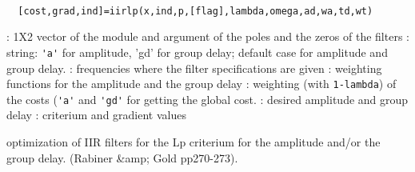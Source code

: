 
\begin{mandesc}
   \\ %
\end{mandesc}
\begin{calling_sequence}
\begin{verbatim}
  [cost,grad,ind]=iirlp(x,ind,p,[flag],lambda,omega,ad,wa,td,wt)  
\end{verbatim}
\end{calling_sequence}
\begin{parameters}
  \begin{varlist}
    : 1X2 vector of the module and argument of the poles and the zeros of the filters
    : string: \verb!'a'!  for amplitude, 'gd' for group delay; default case for amplitude and group delay.
    : frequencies where the filter specifications are given
    : weighting functions for the amplitude and the group delay
    : weighting (with \verb!1-lambda!) of the costs (\verb!'a'! and \verb!'gd'! for getting the global cost.
    : desired amplitude and group delay
    : criterium and gradient values
  \end{varlist}
\end{parameters}
\begin{mandescription}
  optimization of IIR filters for the Lp criterium for the
  amplitude and/or the group delay. (Rabiner \&amp; Gold pp270-273).
\end{mandescription}
